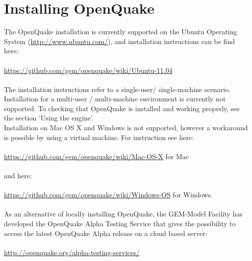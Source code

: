\section{Installing OpenQuake}
The OpenQuake installation is currently supported on the Ubuntu Operating System (\href{http://www.ubuntu.com/}
   {http://www.ubuntu.com/}), and installation instructions can be find here:\\ \\
    \href{https://github.com/gem/openquake/wiki/Ubuntu-11.04}
   {https://github.com/gem/openquake/wiki/Ubuntu-11.04}\\ \\
The installation instructions refer to a single-user/ single-machine scenario. Installation for a multi-user / multi-machine 
environment is currently not supported. To checking that OpenQuake is installed and working properly, see the section 'Using the engine'.\\
Installation on Mac OS X and Windows is not supported, however a workaround is possible by using a virtual machine. For instruction see here:\\ \\
\href{https://github.com/gem/openquake/wiki/Mac-OS-X}
   {https://github.com/gem/openquake/wiki/Mac-OS-X}   for Mac\\ \\
   and here:\\ \\
   \href{https://github.com/gem/openquake/wiki/Windows-OS}
   {https://github.com/gem/openquake/wiki/Windows-OS} for Windows.\\ \\
As an alternative of locally installing OpenQuake, the GEM-Model Facility has developed the OpenQuake Alpha Testing Service that gives the possibility to access the latest OpenQuake Alpha release on a cloud based server:\\ \\
\href{http://openquake.org/alpha-testing-services/}
   {http://openquake.org/alpha-testing-services/}
   
